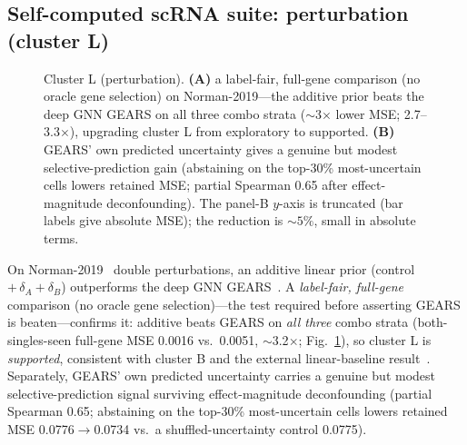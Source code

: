 \documentclass[journal]{IEEEtran}
\begin{document}
\subsection{Self-computed scRNA suite: perturbation (cluster L)}
\begin{figure}[!tbp]\centering
\resizebox{\textwidth}{!}{}
\caption{Cluster L (perturbation). \textbf{(A)} a label-fair, full-gene comparison (no oracle gene selection) on Norman-2019---the additive prior beats the deep GNN GEARS on all three combo strata ($\sim$3$\times$ lower MSE; 2.7--3.3$\times$), upgrading cluster L from exploratory to supported. \textbf{(B)} GEARS' own predicted uncertainty gives a genuine but modest selective-prediction gain (abstaining on the top-30\% most-uncertain cells lowers retained MSE; partial Spearman 0.65 after effect-magnitude deconfounding). The panel-B $y$-axis is truncated (bar labels give absolute MSE); the reduction is ${\sim}5\%$, small in absolute terms.}\label{fig:perturb}\end{figure}
On Norman-2019~\cite{norman2019} double perturbations, an additive linear prior (control $+\,\delta_A+\delta_B$) outperforms the deep GNN GEARS~\cite{roohani2024}. A \emph{label-fair, full-gene} comparison (no oracle gene selection)---the test required before asserting GEARS is beaten---confirms it: additive beats GEARS on \emph{all three} combo strata (both-singles-seen full-gene MSE 0.0016 vs.\ 0.0051, $\sim$3.2$\times$; Fig.~\ref{fig:perturb}), so cluster L is \emph{supported}, consistent with cluster B and the external linear-baseline result~\cite{ahlmann2025}. Separately, GEARS' own predicted uncertainty carries a genuine but modest selective-prediction signal surviving effect-magnitude deconfounding (partial Spearman 0.65; abstaining on the top-30\% most-uncertain cells lowers retained MSE 0.0776$\to$0.0734 vs.\ a shuffled-uncertainty control 0.0775).
\end{document}
